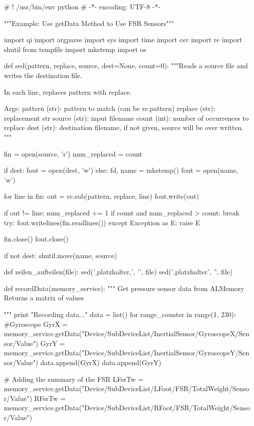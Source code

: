 	\begin{python} [caption={Pythonprogramm für Messaufnahmen}, label=Messungscode]
		# ! /usr/bin/env python
		# -*- encoding: UTF-8 -*-
		
		"""Example: Use getData Method to Use FSR Sensors"""
		
		import qi
		import argparse
		import sys
		import time
		import csv
		import re
		import shutil
		from tempfile import mkstemp
		import os
		
		def sed(pattern, replace, source, dest=None, count=0):
			"""Reads a source file and writes the destination file.
			
			In each line, replaces pattern with replace.
			
			Args:
			pattern (str): pattern to match (can be re.pattern)
			replace (str): replacement str
			source  (str): input filename
			count (int): number of occurrences to replace
			dest (str):   destination filename, if not given, source will be over written.
			"""
			
			fin = open(source, 'r')
			num_replaced = count
			
			if dest:
				fout = open(dest, 'w')
			else:
				fd, name = mkstemp()
				fout = open(name, 'w')
			
			for line in fin:
				out = re.sub(pattern, replace, line)
				fout.write(out)
				
				if out != line:
				num_replaced += 1
				if count and num_replaced > count:
				break
			try:
				fout.writelines(fin.readlines())
			except Exception as E:
				raise E
			
			fin.close()
			fout.close()
			
			if not dest:
				shutil.move(name, source)
		
		
		def zeilen_aufteilen(file):
			sed(',platzhalter,', '\n', file)
			sed(',platzhalter', '', file)
		
		
		def recordData(memory_service):
			""" Get pressure sensor data from ALMemory
			Returns a matrix of values
			
			"""
			print "Recording data..."
			data = list()
			for range_counter in range(1, 230):
				#Gyroscope
				GyrX = memory_service.getData("Device/SubDeviceList/InertialSensor/GyroscopeX/Sensor/Value")
				GyrY = memory_service.getData("Device/SubDeviceList/InertialSensor/GyroscopeY/Sensor/Value")
				data.append(GyrX)
				data.append(GyrY)
				
				# Adding the summary of the FSR
				LFsrTw = memory_service.getData("Device/SubDeviceList/LFoot/FSR/TotalWeight/Sensor/Value")
				RFsrTw = memory_service.getData("Device/SubDeviceList/RFoot/FSR/TotalWeight/Sensor/Value")
				

\end{python}
